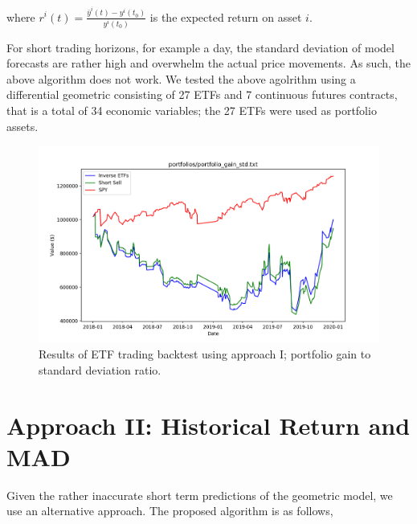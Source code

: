 \documentclass{article}
\begin{document}
where $r^{i}(t) = \frac{\bar{y}^{i}(t)-y^{i}(t_{0})}{y^{i}(t_{0})}$ is
the expected return on asset $i$.

For short trading horizons, for example a day, the standard deviation
of model forecasts are rather high and overwhelm the actual price
movements. As such, the above algorithm does not work. We tested the
above agolrithm using a differential geometric consisting of 27 ETFs
and 7 continuous futures contracts, that is a total of 34 economic
variables; the 27 ETFs were used as portfolio assets.

\begin{figure}
\includegraphics[scale=0.42,bb=0 0 320 240]{figures/Gain_std_maximization.png}
\caption{Results of ETF trading backtest using approach I; portfolio
  gain to standard deviation ratio.}
\label{fig:etf-results-approach-1}
\end{figure}

\section{Approach II: Historical Return and MAD}\label{section:approach-2}

Given the rather inaccurate short term predictions of the geometric
model, we use an alternative approach. The proposed algorithm is as
follows,
\end{document}
